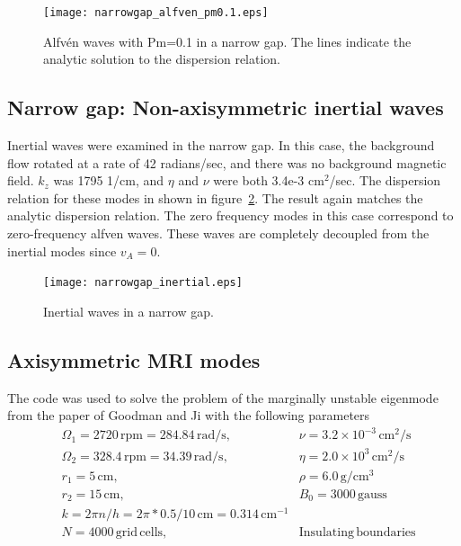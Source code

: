 \documentclass[letterpaper]{article}
\begin{document}
\begin{figure}
\begin{center}
\texttt{[image: narrowgap\_alfven\_pm0.1.eps]}
\caption{Alfv\'en waves with Pm=0.1 in a narrow gap.  The lines
  indicate the analytic solution to the dispersion relation.}
\label{fig:narrowgapalfvenpm0.1}
\end{center}
\end{figure}

\subsection{Narrow gap: Non-axisymmetric inertial waves}
Inertial waves were examined in the narrow gap.  In this case, the
background flow rotated at a rate of 42 radians/sec, and there was no
background magnetic field.  $k_z$ was 1795 1/cm, and $\eta$ and $\nu$
were both 3.4e-3 cm$^2$/sec.  The dispersion relation for these modes
in shown in figure~\ref{fig:narrowgapinertial}.  The result again
matches the analytic dispersion relation.  The zero frequency modes in
this case correspond to zero-frequency alfven waves.  These waves are
completely decoupled from the inertial modes since $v_{A}=0$.

\begin{figure}
\begin{center}
\texttt{[image: narrowgap\_inertial.eps]}
\caption{Inertial waves in a narrow gap.}
\label{fig:narrowgapinertial}
\end{center}
\end{figure}

\subsection{Axisymmetric MRI modes}

The code was used to solve the problem of the marginally unstable
eigenmode from the paper of Goodman and Ji with the following parameters
\begin{align*}
&\Omega_1 = 2720\,\mathrm{rpm} = 284.84\,\mathrm{rad/s},\quad
    &\nu = 3.2\times10^{-3}\,\mathrm{cm^2/s}
\\
&\Omega_2 = 328.4\,\mathrm{rpm} = 34.39\,\mathrm{rad/s},\quad
    &\eta = 2.0\times10^{3}\,\mathrm{cm^2/s}
\\
&r_1 = 5\,\mathrm{cm},\quad &\rho = 6.0\,\mathrm{g/cm^3}
\\
&r_2 = 15\,\mathrm{cm},\quad &B_0 = 3000\, \mathrm{gauss}
\\
&k = 2\pi n/h = 2\pi*0.5/10\,\mathrm{cm} = 0.314\,\mathrm{cm^{-1}}
\\
&N = 4000\,\mathrm{grid\,cells},\quad &\mathrm{Insulating\,boundaries}
\end{align*}
\end{document}
